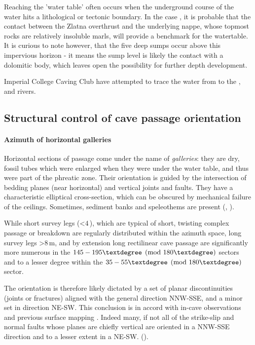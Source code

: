Reaching the 'water table' often occurs when the underground course of the water hits a lithological or tectonic boundary. In the case , it is probable that the contact between the Zlatna overthrust and the underlying  nappe, whose topmost rocks are relatively insoluble marls, will provide a benchmark for the watertable. It is curious to note however, that the five deep sumps occur above this impervious horizon - it means the sump level is likely the contact with a dolomitic body, which leaves open the possibility for further depth development. 

Imperial College Caving Club have attempted to trace the water from  \citep{hm1} to the ,  and  rivers.
 
 
 \subsection{Structural control of cave passage orientation}
 \paragraph{Azimuth of horizontal galleries}
 Horizontal sections of passage come under the name of \emph{galleries}: they are dry, fossil tubes which were enlarged when they were under the water table, and thus were part of the phreatic zone. Their orientation is guided by the intersection of bedding planes (near horizontal) and vertical joints and faults. They have a characteristic elliptical cross-section, which can be obscured by mechanical failure of the ceilings. Sometimes, sediment banks and speleothems are present (, ).

While short survey legs (<$4$\,), which are typical of short, twisting complex passage or breakdown are regularly distributed within the azimuth space, long survey legs >$8$\,m, and by extension long rectilinear cave passage are significantly more numerous in the $145-195\textdegree  \pmod{180\textdegree}$  sectors and to a lesser degree within the $35-55\textdegree   \pmod{180\textdegree }$ sector.


The orientation is therefore likely dictated by a set of planar discontinuities (joints or fractures) aligned with the general direction NNW-SSE, and a minor set in direction NE-SW. This conclusion is in accord with in-cave observations \citep{hm1}  and previous surface mapping \citep{buser1986tolmavc} . Indeed many, if not all of the strike-slip and normal faults whose planes are chiefly vertical are oriented in a NNW-SSE direction and to a lesser extent in a NE-SW. ().

